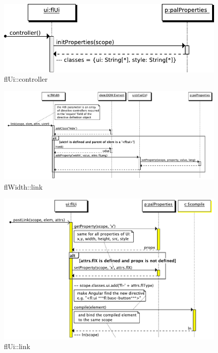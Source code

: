 \begin{figure}[htb]
    \centering
    \includegraphics{figures/design/seqdia/ui-controller.pdf}
    \caption{flUi::controller}
    \label{fig:design-seqdia-ui-controller}
\end{figure}

\begin{figure}[htb]
    \centering
    \includegraphics{figures/design/seqdia/width-link.pdf}
    \caption{flWidth::link}
    \label{fig:design-seqdia-width-link}
\end{figure}

\begin{figure}[htb]
    \centering
    \includegraphics{figures/design/seqdia/ui-link.pdf}
    \caption{flUi::link}
    \label{fig:design-seqdia-ui-link}
\end{figure}

